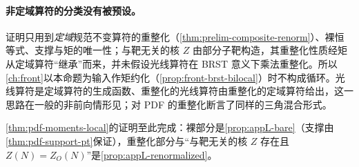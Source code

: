 \paragraph{非定域算符的分类没有被预设。}
证明只用到\emph{定域}规范不变算符的重整化（\cref{thm:prelim-composite-renorm}）、裸恒等式、支撑与矩的唯一性；与靶无关的核 $Z$ 由部分子靶构造，其重整化性质经矩从定域算符“继承”而来，并未假设光线算符在 BRST 意义下乘法重整化。所以\cref{ch:front}以本命题为输入作矩约化（\cref{prop:front-brst-bilocal}）时不构成循环。光线算符是定域算符的生成函数、重整化的光线算符由重整化的定域算符给出，这一思路在一般的非前向情形见\cite[式~(2.4)、(2.6)、(3.1)、(3.2)]{Braun:2019qtp}；\cite[第~11.4~节]{Collins2011}对 PDF 的重整化断言了同样的三角混合形式。

\cref{thm:pdf-moments-local}的证明至此完成：裸部分是\cref{prop:appL-bare}（支撑由\cref{thm:pdf-support-pt}保证），重整化部分与“与靶无关的核 $Z$ 存在且 $Z(N)=Z_O(N)$”是\cref{prop:appL-renormalized}。

